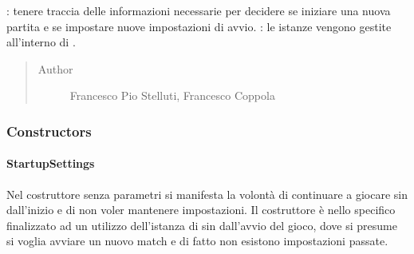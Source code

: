 \documentclass[letterpaper,10pt,italian,openany,oneside]{sphinxmanual}
\begin{document}
\begin{fulllineitems}
\label{\detokenize{test/it/unicam/cs/pa/mastermind/gamecore/StartupSettings:it.unicam.cs.pa.mastermind.gamecore.StartupSettings}}
: tenere traccia delle informazioni necessarie per decidere se iniziare una nuova partita e se impostare nuove impostazioni di avvio. : le istanze vengono gestite all’interno di .
\begin{quote}\begin{description}
\item[{Author}] \leavevmode
Francesco Pio Stelluti, Francesco Coppola

\end{description}\end{quote}

\end{fulllineitems}



\subsubsection{Constructors}
\label{\detokenize{test/it/unicam/cs/pa/mastermind/gamecore/StartupSettings:constructors}}

\paragraph{StartupSettings}
\label{\detokenize{test/it/unicam/cs/pa/mastermind/gamecore/StartupSettings:id1}}

\begin{fulllineitems}
\label{\detokenize{test/it/unicam/cs/pa/mastermind/gamecore/StartupSettings:it.unicam.cs.pa.mastermind.gamecore.StartupSettings.StartupSettings()}}
Nel costruttore senza parametri si manifesta la volontà di continuare a giocare sin dall’inizio e di non voler mantenere impostazioni. Il costruttore è nello specifico finalizzato ad un utilizzo dell’istanza di  sin dall’avvio del gioco, dove si presume si voglia avviare un nuovo match e di fatto non esistono impostazioni passate.

\end{fulllineitems}
\end{document}
